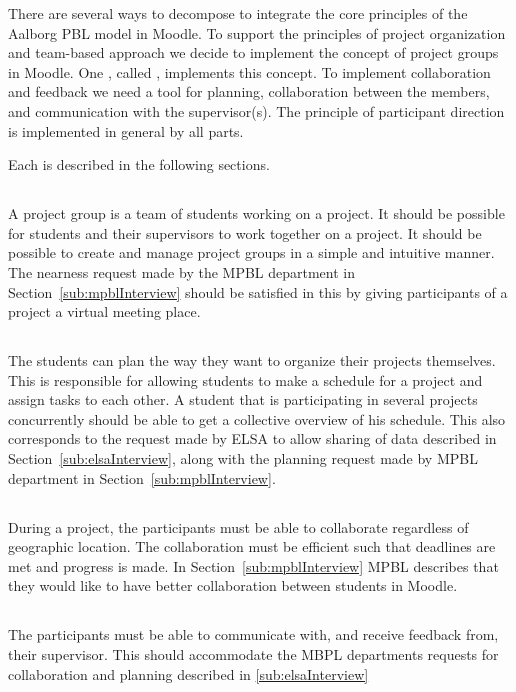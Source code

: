 There are several ways to decompose \system{} to integrate the core principles of the Aalborg PBL model in Moodle. 
To support the principles of project organization and team-based approach we decide to implement the concept of project groups in Moodle.
One \subsystem{}, called \administrationgroup{}, implements this concept.
To implement collaboration and feedback we need a tool for planning, collaboration between the members, and communication with the supervisor(s). 
The principle of participant direction is implemented in general by all parts. 

Each \subsystem{} is described in the following sections.

\subsection{\administrationgroup{}} %
\label{sec:admgroupdecom}
A project group is a team of students working on a project.
It should be possible for students and their supervisors to work together on a project.
It should be possible to create and manage project groups in a simple and intuitive manner.
The nearness request made by the MPBL department in Section~\ref{sub:mpblInterview} should be satisfied in this \subsystem{} by giving participants of a project a virtual meeting place.

\subsection{\timelinegroup{}} %
\label{sec:tmlgroupdecom}
The students can plan the way they want to organize their projects themselves.
This \subsystem{} is responsible for allowing students to make a schedule for a project and assign tasks to each other.
A student that is participating in several projects concurrently should be able to get a collective overview of his schedule.
This also corresponds to the request made by ELSA to allow sharing of data described in Section~\ref{sub:elsaInterview}, along with the planning request made by MPBL department in Section~\ref{sub:mpblInterview}.

\subsection{\blackboardgroup{}} %
During a project, the participants must be able to collaborate regardless of geographic location.
The collaboration must be efficient such that deadlines are met and progress is made.
In Section~\ref{sub:mpblInterview} MPBL describes that they would like to have better collaboration between students in Moodle.

\subsection{\supervisorgroup{}} %
\label{sub:supervisorPluginDescription}
The participants must be able to communicate with, and receive feedback from, their supervisor.
This \subsystem{} should accommodate the MBPL departments requests for collaboration and planning described in \ref{sub:elsaInterview}


